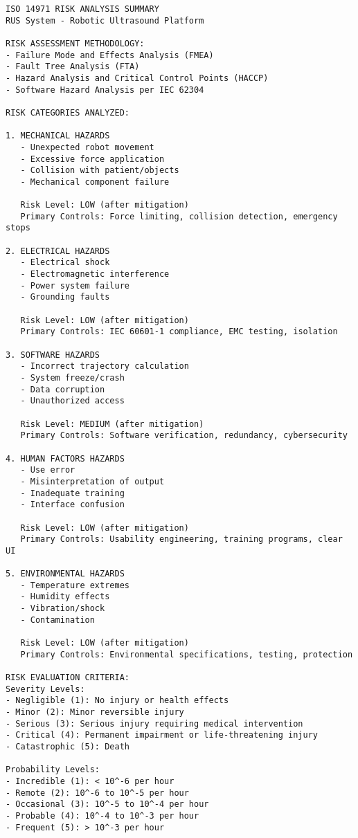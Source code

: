 \begin{lstlisting}[basicstyle=\ttfamily\footnotesize, caption={Risk Analysis Summary}, label={lst:app-risk-analysis}]
ISO 14971 RISK ANALYSIS SUMMARY
RUS System - Robotic Ultrasound Platform

RISK ASSESSMENT METHODOLOGY:
- Failure Mode and Effects Analysis (FMEA)
- Fault Tree Analysis (FTA)
- Hazard Analysis and Critical Control Points (HACCP)
- Software Hazard Analysis per IEC 62304

RISK CATEGORIES ANALYZED:

1. MECHANICAL HAZARDS
   - Unexpected robot movement
   - Excessive force application
   - Collision with patient/objects
   - Mechanical component failure
   
   Risk Level: LOW (after mitigation)
   Primary Controls: Force limiting, collision detection, emergency stops

2. ELECTRICAL HAZARDS
   - Electrical shock
   - Electromagnetic interference
   - Power system failure
   - Grounding faults
   
   Risk Level: LOW (after mitigation)
   Primary Controls: IEC 60601-1 compliance, EMC testing, isolation

3. SOFTWARE HAZARDS
   - Incorrect trajectory calculation
   - System freeze/crash
   - Data corruption
   - Unauthorized access
   
   Risk Level: MEDIUM (after mitigation)
   Primary Controls: Software verification, redundancy, cybersecurity

4. HUMAN FACTORS HAZARDS
   - Use error
   - Misinterpretation of output
   - Inadequate training
   - Interface confusion
   
   Risk Level: LOW (after mitigation)
   Primary Controls: Usability engineering, training programs, clear UI

5. ENVIRONMENTAL HAZARDS
   - Temperature extremes
   - Humidity effects
   - Vibration/shock
   - Contamination
   
   Risk Level: LOW (after mitigation)
   Primary Controls: Environmental specifications, testing, protection

RISK EVALUATION CRITERIA:
Severity Levels:
- Negligible (1): No injury or health effects
- Minor (2): Minor reversible injury
- Serious (3): Serious injury requiring medical intervention
- Critical (4): Permanent impairment or life-threatening injury
- Catastrophic (5): Death

Probability Levels:
- Incredible (1): < 10^-6 per hour
- Remote (2): 10^-6 to 10^-5 per hour
- Occasional (3): 10^-5 to 10^-4 per hour
- Probable (4): 10^-4 to 10^-3 per hour
- Frequent (5): > 10^-3 per hour


\end{lstlisting}
